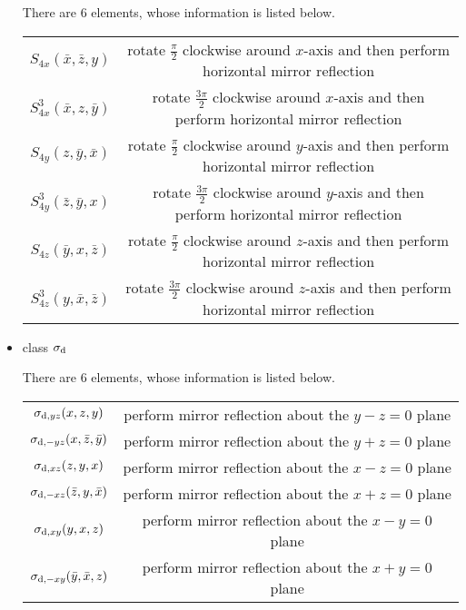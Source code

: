 \documentclass[a4paper]{book}
\begin{document}
\begin{solution}
\begin{itemize}
		There are 6 elements, whose information is listed below. \vspace{-1em}
		\begin{center}
		\begin{tabular}{c|c} \hline
			$S_{4x}(\bar x,\bar z, y)$	& rotate $\frac\pi2$ clockwise around $x$-axis and then perform horizontal mirror reflection\\
			$S^3_{4x}(\bar x, z, \bar y)$	& rotate $\frac{3\pi}2$ clockwise around $x$-axis and then perform horizontal mirror reflection\\
			$S_{4y}(z, \bar y, \bar x)$	& rotate $\frac\pi2$ clockwise around $y$-axis and then perform horizontal mirror reflection\\
			$S^3_{4y}(\bar z, \bar y, x)$ & rotate $\frac{3\pi}2$ clockwise around $y$-axis and then perform horizontal mirror reflection\\
			$S_{4z}(\bar y, x, \bar z)$	& rotate $\frac\pi2$ clockwise around $z$-axis and then perform horizontal mirror reflection\\
			$S^3_{4z}(y, \bar x, \bar z)$	& rotate $\frac{3\pi}2$ clockwise around $z$-axis and then perform horizontal mirror reflection\\ \hline
		\end{tabular}
		\end{center}
		
		\item class $\sigma_{\rm d}$

		There are 6 elements, whose information is listed below. \vspace{-1em}
		\begin{center}
		\begin{tabular}{c|c} \hline
			$\sigma_{{\rm d},yz}(x, z, y)$ & perform mirror reflection about the $y-z=0$ plane \\
			$\sigma_{{\rm d},-yz}(x, \bar z, \bar y)$	& perform mirror reflection about the $y+z=0$ plane \\
			$\sigma_{{\rm d},xz}(z, y, x)$ & perform mirror reflection about the $x-z=0$ plane \\
			$\sigma_{{\rm d},-xz}(\bar z, y, \bar x)$	& perform mirror reflection about the $x+z=0$ plane \\
			$\sigma_{{\rm d},xy}(y, x, z)$ & perform mirror reflection about the $x-y=0$ plane \\
			$\sigma_{{\rm d},-xy}(\bar y, \bar x, z)$	& perform mirror reflection about the $x+y=0$ plane \\ \hline
		\end{tabular}
		\end{center}


\end{itemize}
\end{solution}
\end{document}
